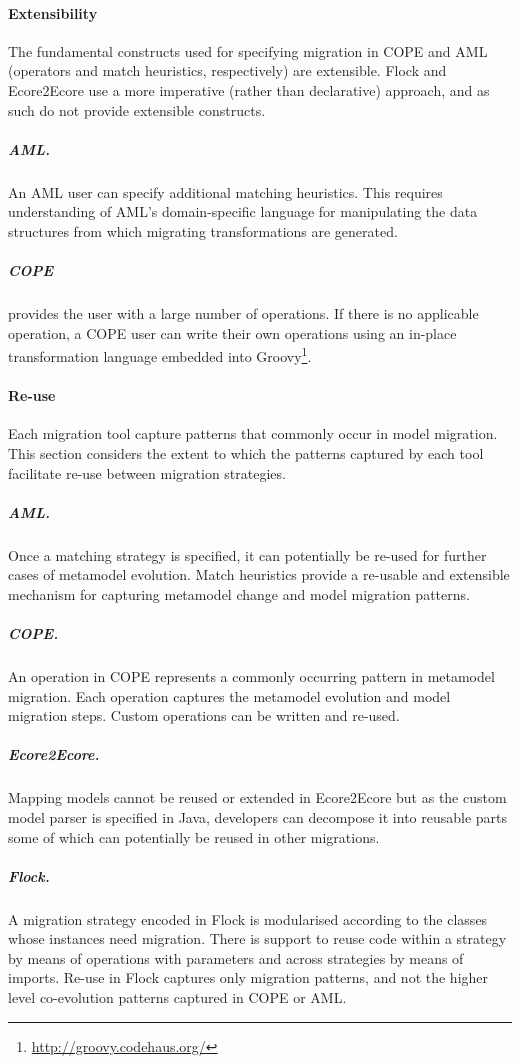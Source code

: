 \paragraph{Extensibility}
The fundamental constructs used for specifying migration in COPE and AML (operators and match heuristics, respectively) are extensible. Flock and Ecore2E\-core use a more imperative (rather than declarative) approach, and as such do not provide extensible constructs.

\subparagraph{AML.} An AML user can specify additional matching heuristics. This requires understanding of AML's domain-specific language for manipulating the data structures from which migrating transformations are generated.

\subparagraph{COPE} provides the user with a large number of operations. If there is no applicable operation, a COPE user can write their own operations using an in-place transformation language embedded into Groovy\footnote{\url{http://groovy.codehaus.org/}}.


\paragraph{Re-use}
Each migration tool capture patterns that commonly occur in model migration. This section considers the extent to which the patterns captured by each tool facilitate re-use between migration strategies.

\subparagraph{AML.} Once a matching strategy is specified, it can potentially be re-used for further cases of metamodel evolution. Match heuristics provide a re-usable and extensible mechanism for capturing metamodel change and model migration patterns.

\subparagraph{COPE.} An operation in COPE represents a commonly occurring pattern in metamodel migration. Each operation captures the metamodel evolution and model migration steps. Custom operations can be written and re-used.

\subparagraph{Ecore2Ecore.} Mapping models cannot be reused or extended in Ecore2Ecore but as the custom model parser is specified in Java, developers can decompose it into reusable parts some of which can potentially be reused in other migrations.

\subparagraph{Flock.} A migration strategy encoded in Flock is modularised according to the classes whose instances need migration. There is support to reuse code within a strategy by means of operations with parameters and across strategies by means of imports. Re-use in Flock captures only migration patterns, and not the higher level co-evolution patterns captured in COPE or AML.



